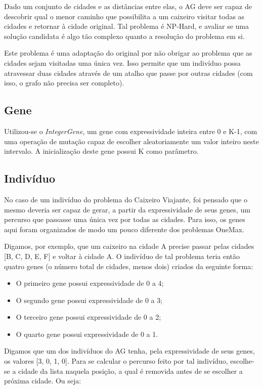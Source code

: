 Dado um conjunto de cidades e as distâncias entre elas, o AG deve ser capaz de descobrir qual o menor caminho que possibilita a um caixeiro visitar todas as cidades e retornar à cidade original. Tal problema é NP-Hard, e avaliar se uma solução candidata é algo tão complexo quanto a resolução do problema em si.

Este problema é uma adaptação do original por não obrigar ao problema que as cidades sejam visitadas uma única vez. Isso permite que um indivíduo possa atravessar duas cidades através de um atalho que passe por outras cidades (com isso, o grafo não precisa ser completo).

\subsection*{Gene}

Utilizou-se o \emph{IntegerGene}, um gene com expressividade inteira entre 0 e K-1, com uma operação de mutação capaz de escolher aleatoriamente um valor inteiro neste intervalo. A inicialização deste gene possui K como parâmetro.

\subsection*{Indivíduo}

No caso de um indivíduo do problema do Caixeiro Viajante, foi pensado que o mesmo deveria ser capaz de gerar, a partir da expressividade de seus genes, um percurso que passasse uma única vez por todas as cidades. Para isso, os genes aqui foram organizados de modo um pouco diferente dos problemas OneMax.

Digamos, por exemplo, que um caixeiro na cidade A precise passar pelas cidades [B, C, D, E, F] e voltar à cidade A. O indivíduo de tal problema teria então quatro genes (o número total de cidades, menos dois) criados da seguinte forma:

\begin{itemize}
	\item O primeiro gene possui expressividade de 0 a 4;
	\item O segundo gene possui expressividade de 0 a 3;
	\item O terceiro gene possui expressividade de 0 a 2;
	\item O quarto gene possui expressividade de 0 a 1.
\end{itemize}

Digamos que um dos indivíduos do AG tenha, pela expressividade de seus genes, os valores [3, 0, 1, 0]. Para se calcular o percurso feito por tal indivíduo, escolhe-se a cidade da lista naquela posição, a qual é removida antes de se escolher a próxima cidade. Ou seja:

